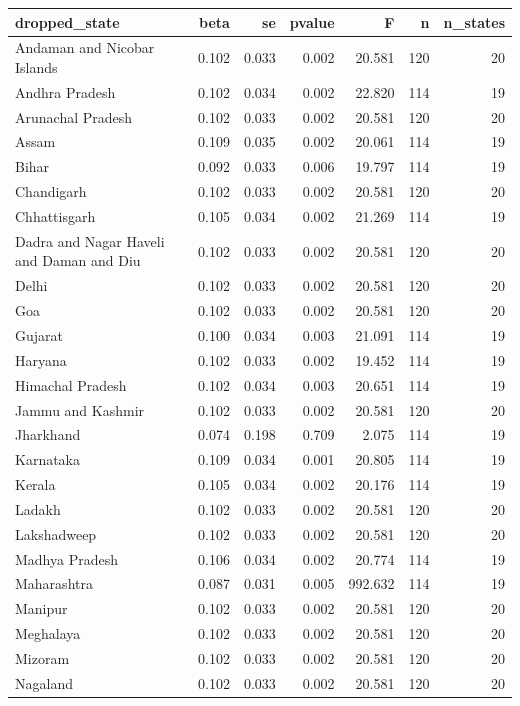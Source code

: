 \begin{tabular}{lrrrrrr}
\toprule
dropped_state & beta & se & pvalue & F & n & n_states \\
\midrule
Andaman and Nicobar Islands & 0.102 & 0.033 & 0.002 & 20.581 & 120 & 20 \\
Andhra Pradesh & 0.102 & 0.034 & 0.002 & 22.820 & 114 & 19 \\
Arunachal Pradesh & 0.102 & 0.033 & 0.002 & 20.581 & 120 & 20 \\
Assam & 0.109 & 0.035 & 0.002 & 20.061 & 114 & 19 \\
Bihar & 0.092 & 0.033 & 0.006 & 19.797 & 114 & 19 \\
Chandigarh & 0.102 & 0.033 & 0.002 & 20.581 & 120 & 20 \\
Chhattisgarh & 0.105 & 0.034 & 0.002 & 21.269 & 114 & 19 \\
Dadra and Nagar Haveli and Daman and Diu & 0.102 & 0.033 & 0.002 & 20.581 & 120 & 20 \\
Delhi & 0.102 & 0.033 & 0.002 & 20.581 & 120 & 20 \\
Goa & 0.102 & 0.033 & 0.002 & 20.581 & 120 & 20 \\
Gujarat & 0.100 & 0.034 & 0.003 & 21.091 & 114 & 19 \\
Haryana & 0.102 & 0.033 & 0.002 & 19.452 & 114 & 19 \\
Himachal Pradesh & 0.102 & 0.034 & 0.003 & 20.651 & 114 & 19 \\
Jammu and Kashmir & 0.102 & 0.033 & 0.002 & 20.581 & 120 & 20 \\
Jharkhand & 0.074 & 0.198 & 0.709 & 2.075 & 114 & 19 \\
Karnataka & 0.109 & 0.034 & 0.001 & 20.805 & 114 & 19 \\
Kerala & 0.105 & 0.034 & 0.002 & 20.176 & 114 & 19 \\
Ladakh & 0.102 & 0.033 & 0.002 & 20.581 & 120 & 20 \\
Lakshadweep & 0.102 & 0.033 & 0.002 & 20.581 & 120 & 20 \\
Madhya Pradesh & 0.106 & 0.034 & 0.002 & 20.774 & 114 & 19 \\
Maharashtra & 0.087 & 0.031 & 0.005 & 992.632 & 114 & 19 \\
Manipur & 0.102 & 0.033 & 0.002 & 20.581 & 120 & 20 \\
Meghalaya & 0.102 & 0.033 & 0.002 & 20.581 & 120 & 20 \\
Mizoram & 0.102 & 0.033 & 0.002 & 20.581 & 120 & 20 \\
Nagaland & 0.102 & 0.033 & 0.002 & 20.581 & 120 & 20 \\

\end{tabular}
